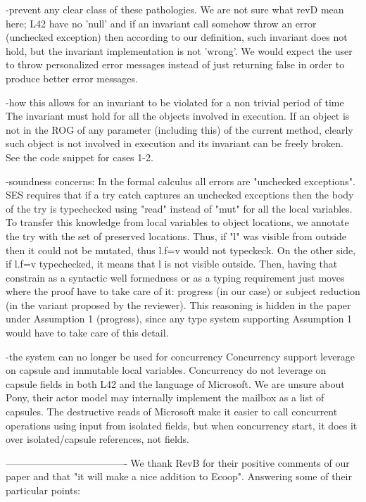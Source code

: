 -prevent any clear class of these pathologies.
We are not sure what revD mean here; L42 have no 'null' and if an invariant call
somehow throw an error (unchecked exception) then according to our definition, such invariant does
not hold, but the invariant implementation is not 'wrong'. We would expect the user to 
throw personalized error messages instead of just returning false in order to produce better error messages.

-how this allows for an invariant to be violated for a non trivial period of time
The invariant must hold for all the objects involved in execution.
If an object is not in the ROG of any parameter (including this) of the current method,
clearly such object is not involved in execution and its invariant can be freely broken.
 See the code snippet for cases 1-2.


-soundness concerns:
  In the formal calculus all errors are "unchecked exceptions".
  SES requires that if a try catch captures an unchecked exceptions then the body of the try
is typechecked using "read" instead of "mut" for all the local variables.
  To transfer this knowledge from local variables to object locations, we annotate the try with
the set of preserved locations.
  Thus, if "l" was visible from outside then it could not be mutated, thus l.f=v would not typeckeck.
  On the other side, if l.f=v typechecked, it means that l is not visible outside.
  Then, having that constrain as a syntactic well formedness or as a typing requirement just moves 
where the proof have to take care of it: progress (in our case) or subject reduction
 (in the variant proposed by the reviewer).
  This reasoning is hidden in the paper under Assumption 1 (progress), since any type system
 supporting Assumption 1 would have to take care of this detail.

-the system can no longer be used for concurrency
Concurrency support leverage on capsule and immutable local variables.
Concurrency do not leverage on capsule fields in both L42 and the language of Microsoft.
We are unsure about Pony, their actor model may internally implement the mailbox as a list of capsules.
The destructive reads of Microsoft make it easier to call concurrent operations using input
 from isolated fields, but when concurrency start, it does it over isolated/capsule references, not fields.


-------------------------------------
We thank RevB for their positive comments of our paper and that "it will make a nice addition to Ecoop".
Answering some of their particular points: 

